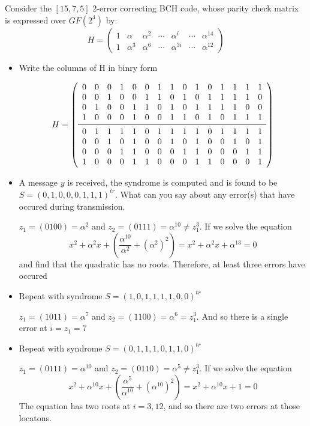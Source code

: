 \documentclass{homework}
\begin{document}
\begin{problem}
  Consider the $[15,7,5]$ 2-error correcting BCH code, whose parity check matrix
  is expressed over $GF(2^4)$ by:
  \[
    H = \begin{pmatrix}
      1 & \alpha & \alpha^2 & \cdots & \alpha^i & \cdots & \alpha^{14}\\
      1 & \alpha^3 & \alpha^6 & \cdots & \alpha^{3i} & \cdots & \alpha^{12}
    \end{pmatrix}
  \]
  \begin{itemize}
    \item
      Write the columns of H in binry form

      \[
        H = \left(\begin{array}{ccccccccccccccc}
            0&0&0&1&0&0&1&1&0&1&0&1&1&1&1\\
            0&0&1&0&0&1&1&0&1&0&1&1&1&1&0\\
            0&1&0&0&1&1&0&1&0&1&1&1&1&0&0\\
            1&0&0&0&1&0&0&1&1&0&1&0&1&1&1\\
            \midrule
            0&1&1&1&1&0&1&1&1&1&0&1&1&1&1\\
            0&0&1&0&1&0&0&1&0&1&0&0&1&0&1\\
            0&0&0&1&1&0&0&0&1&1&0&0&0&1&1\\
            1&0&0&0&1&1&0&0&0&1&1&0&0&0&1\\
        \end{array}\right)
      \]
    \item
      A message $y$ is received, the syndrome is computed and is found to be $S
      = (0,1,0,0,0,1,1,1)^{tr}$. What can you say about any error(s) that have
      occured during transmission.

      $z_1 = (0100) = \alpha^2$ and $z_2 = (0111) = \alpha^{10} \ne z_1^3$. If
      we solve the equation  \[
        x^2 + \alpha^2x+(\frac{\alpha^{10}}{\alpha^2}+(\alpha^2)^2) = x^2 +
        \alpha^2x+\alpha^{13} = 0
      \]
      and find that the quadratic has no roots. Therefore, at least three errors
      have occured
    \item
      Repeat with syndrome $S = (1,0,1,1,1,1,0,0)^{tr}$

      $z_1 = (1011) = \alpha^7$ and $z_2 = (1100) = \alpha^{6} = z_1^3$.
      And so there is a single error at $i = z_1 = 7$
    \item
      Repeat with syndrome $S = (0,1,1,1,0,1,1,0)^{tr}$

      $z_1 = (0111) = \alpha^{10}$ and $z_2 = (0110) = \alpha^{5} \ne z_1^3$.
      If
      we solve the equation  \[
        x^2 + \alpha^{10}x+(\frac{\alpha^5}{\alpha^{10}}+(\alpha^{10})^2) = x^2 +
        \alpha^{10}x+1 = 0
      \]
      The equation has two roots at $i = 3,12$, and so there are two errors at
      those locatons.

  \end{itemize}
\end{problem}
\end{document}
